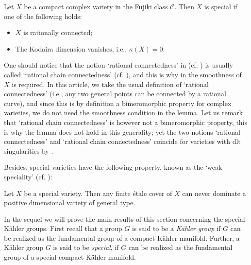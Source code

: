 \begin{lemme}\label{lem-kappa-special}
Let $X$ be 
a compact complex variety in the Fujiki class $\mathcal{C}$.
Then $X$ is special if one of the following holds:
\begin{itemize}
\item[\rm(1)] $X$ is rationally connected;
\item[\rm(2)] The Kodaira dimension vanishes, i.e., $\kappa(X)=0$.	
\end{itemize}
\end{lemme}

\begin{rmq}
One should notice that the notion `rational connectedness' in \cite{Cam04} (cf. \cite[\S 3.3]{Cam04}) is usually called `rational chain connectedness' (cf. \cite[3.2 Definition]{Kollar96}), and this is why in \cite[Theorem 3.22]{Cam04} the smoothness of $X$ is required. In this article, we take the usual definition of `rational connectedness' (i.e., any two general points can be connected by a rational curve), and since this is by definition a bimeromorphic property for complex varieties, we do not need the smoothness condition in the lemma. Let us remark that `rational chain connectedness' is however not a bimeromorphic property, this is why the lemma does not hold in this generality; yet the two notions `rational connectedness' and `rational chain connectedness' coincide for varieties with dlt singularities by \cite[Corollary 1.5(2)]{HM07}.      
\end{rmq}

Besides, special varieties have the following property, known as the `weak speciality' (cf. \cite[\S 9]{Cam04}):
\begin{lemme}\label{lem-special-no-to-gt}
Let $X$ be a special variety. 
Then any finite \'etale cover of $X$ can never dominate a positive dimensional variety of general type.
\end{lemme}




In the sequel we will prove the main results of this section concerning the special K\"ahler groups. First recall that a group $G$ is said to be a \textit{K\"ahler group} if $G$ can be realized as the fundamental group of a compact K\"ahler manifold. 
Further, a K\"ahler group $G$ is said to be \textit{special}, if $G$ can be realized as the fundamental group of a special compact K\"ahler manifold.

